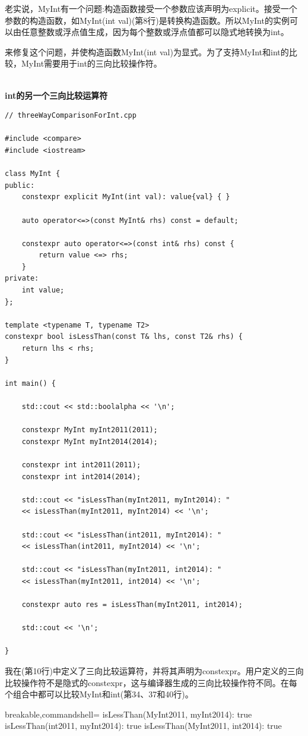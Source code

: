 老实说，MyInt有一个问题:构造函数接受一个参数应该声明为explicit。接受一个参数的构造函数，如MyInt(int val)(第8行)是转换构造函数。所以MyInt的实例可以由任意整数或浮点值生成，因为每个整数或浮点值都可以隐式地转换为int。

来修复这个问题，并使构造函数MyInt(int val)为显式。为了支持MyInt和int的比较，MyInt需要用于int的三向比较操作符。

\hspace*{\fill} \\ %
\noindent
\textbf{int的另一个三向比较运算符}
\begin{lstlisting}[style=styleCXX]
// threeWayComparisonForInt.cpp

#include <compare>
#include <iostream>

class MyInt {
public:
	constexpr explicit MyInt(int val): value{val} { }
	
	auto operator<=>(const MyInt& rhs) const = default;
	
	constexpr auto operator<=>(const int& rhs) const {
		return value <=> rhs;
	}
private:
	int value;
};

template <typename T, typename T2>
constexpr bool isLessThan(const T& lhs, const T2& rhs) {
	return lhs < rhs;
}

int main() {

	std::cout << std::boolalpha << '\n';
	
	constexpr MyInt myInt2011(2011);
	constexpr MyInt myInt2014(2014);
	
	constexpr int int2011(2011);
	constexpr int int2014(2014);
	
	std::cout << "isLessThan(myInt2011, myInt2014): "
	<< isLessThan(myInt2011, myInt2014) << '\n';
	
	std::cout << "isLessThan(int2011, myInt2014): "
	<< isLessThan(int2011, myInt2014) << '\n';
	
	std::cout << "isLessThan(myInt2011, int2014): "
	<< isLessThan(myInt2011, int2014) << '\n';
	
	constexpr auto res = isLessThan(myInt2011, int2014);
	
	std::cout << '\n';

}
\end{lstlisting}

我在(第10行)中定义了三向比较运算符，并将其声明为constexpr。用户定义的三向比较操作符不是隐式的constexpr，这与编译器生成的三向比较操作符不同。在每个组合中都可以比较MyInt和int(第34、37和40行)。

\begin{tcblisting}{breakable,commandshell={}}
isLessThan(MyInt2011, myInt2014): true
isLessThan(int2011, myInt2014): true
isLessThan(MyInt2011, int2014): true
\end{tcblisting}

